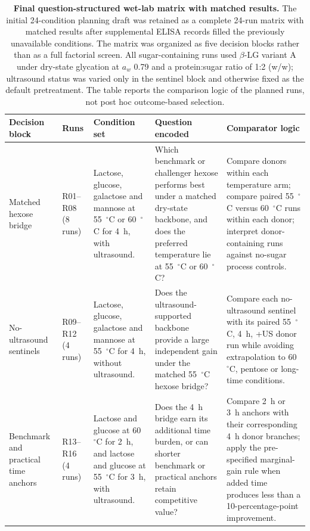 \begin{table}[p]
\centering
\footnotesize
\setlength{\tabcolsep}{2.5pt}
\caption{
\textbf{Final question-structured wet-lab matrix with matched results.}
The initial 24-condition planning draft was retained as a complete 24-run matrix with matched results after supplemental ELISA records filled the previously unavailable conditions. The matrix was organized as five decision blocks rather than as a full factorial screen. All sugar-containing runs used $\beta$-LG variant A under dry-state glycation at $a_w$ 0.79 and a protein:sugar ratio of 1:2 (w/w); ultrasound status was varied only in the sentinel block and otherwise fixed as the default pretreatment. The table reports the comparison logic of the planned runs, not post hoc outcome-based selection.
}
\label{tab:question_matrix}
\begin{tabular}{@{}p{}p{}p{}p{}p{}@{}}
\toprule
\textbf{Decision block} & \textbf{Runs} & \textbf{Condition set} & \textbf{Question encoded} & \textbf{Comparator logic} \\
\midrule
Matched hexose bridge & R01--R08 (8 runs) & Lactose, glucose, galactose and mannose at 55~$^\circ$C or 60~$^\circ$C for 4~h, with ultrasound. & Which benchmark or challenger hexose performs best under a matched dry-state backbone, and does the preferred temperature lie at 55~$^\circ$C or 60~$^\circ$C? & Compare donors within each temperature arm; compare paired 55~$^\circ$C versus 60~$^\circ$C runs within each donor; interpret donor-containing runs against no-sugar process controls. \\
\addlinespace
No-ultrasound sentinels & R09--R12 (4 runs) & Lactose, glucose, galactose and mannose at 55~$^\circ$C for 4~h, without ultrasound. & Does the ultrasound-supported backbone provide a large independent gain under the matched 55~$^\circ$C hexose bridge? & Compare each no-ultrasound sentinel with its paired 55~$^\circ$C, 4~h, +US donor run while avoiding extrapolation to 60~$^\circ$C, pentose or long-time conditions. \\
\addlinespace
Benchmark and practical time anchors & R13--R16 (4 runs) & Lactose and glucose at 60~$^\circ$C for 2~h, and lactose and glucose at 55~$^\circ$C for 3~h, with ultrasound. & Does the 4~h bridge earn its additional time burden, or can shorter benchmark or practical anchors retain competitive value? & Compare 2~h or 3~h anchors with their corresponding 4~h donor branches; apply the pre-specified marginal-gain rule when added time produces less than a 10-percentage-point improvement. \\

\end{tabular}
\end{table}
